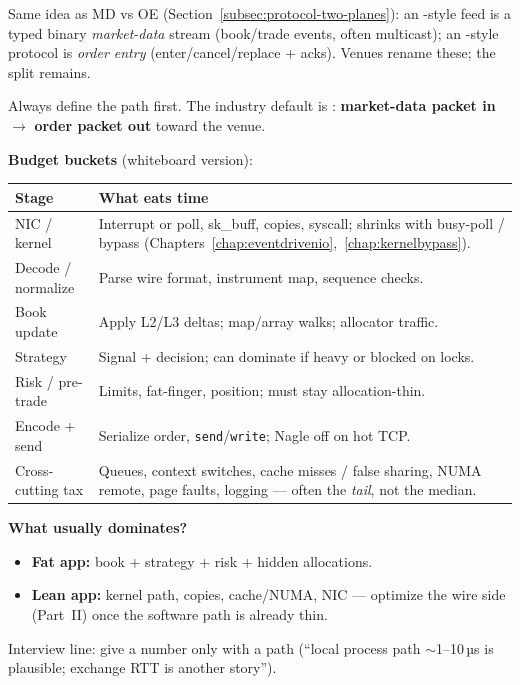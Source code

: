 Same idea as MD vs OE (Section~\ref{subsec:protocol-two-planes}): an 
-style feed is a typed binary \emph{market-data} stream (book/trade 
events, often multicast); an -style protocol is \emph{order entry} 
(enter/cancel/replace + acks). Venues rename these; the split remains.

\label{qa:latency-composition}
Always define the path first. The industry default is :
\textbf{market-data packet in} $\rightarrow$ \textbf{order packet out} toward the venue.
\newline
\begin{center}

\label{fig:tick-to-trade-latency}
\end{center}

\textbf{Budget buckets} (whiteboard version):
\begin{center}
\small
\begin{tabular}{|l|p{8.2cm}|}
\hline
\textbf{Stage} & \textbf{What eats time} \\
\hline
NIC / kernel & Interrupt or poll, sk\_buff, copies, syscall; shrinks with busy-poll / bypass 
  (Chapters~\ref{chap:eventdrivenio},~\ref{chap:kernelbypass}). \\
\hline
Decode / normalize & Parse wire format, instrument map, sequence checks. \\
\hline
Book update & Apply L2/L3 deltas; map/array walks; allocator traffic. \\
\hline
Strategy & Signal + decision; can dominate if heavy or blocked on locks. \\
\hline
Risk / pre-trade & Limits, fat-finger, position; must stay allocation-thin. \\
\hline
Encode + send & Serialize order, \texttt{send}/\texttt{write}; Nagle off on hot TCP. \\
\hline
Cross-cutting tax & Queues, context switches, cache misses / false sharing, NUMA remote, 
  page faults, logging --- often the \emph{tail}, not the median. \\
\hline
\end{tabular}
\end{center}

\textbf{What usually dominates?}
\begin{itemize}
    \item \textbf{Fat app:} book + strategy + risk + hidden allocations.
    \item \textbf{Lean app:} kernel path, copies, cache/NUMA, NIC --- optimize the wire side 
          (Part~II) once the software path is already thin.
\end{itemize}
Interview line: give a number only with a path (``local process path $\sim$1--10\,µs is 
plausible; exchange RTT is another story'').

